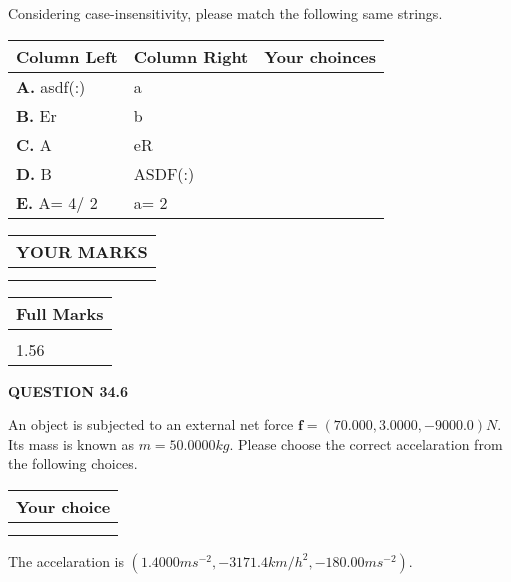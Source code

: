 \documentclass[12pt]{article}
\begin{document}
  
Considering case-insensitivity, please match the following same strings.
  
  
\begin{tabular}{|l|l|l|}
 \hline
 Column Left & Column Right  & Your choinces \\ 
 \hline
{\textbf{\large{
A.}}}
asdf(:)
  & 
a
 & 
 \\ 
 \hline
{\textbf{\large{
B.}}}
Er
  & 
b
 & 
 \\ 
 \hline
{\textbf{\large{
C.}}}
A
  & 
eR
 & 
 \\ 
 \hline
{\textbf{\large{
D.}}}
B
  & 
ASDF(:)
 & 
 \\ 
 \hline
{\textbf{\large{
E.}}}
 A= %
4/ %
2

  & 
 a= %
2
 & 
 \\ 
 \hline
 \end{tabular}
  
  
 
  
\vspace{0.2in}
  
\noindent\begin{tabular}{|l|}
\hline
 YOUR MARKS  \\
\hline
 \\ 
 \\ 
\hline
\end{tabular}
\hspace{0.05in} \begin{tabular}{|l|}
\hline
 Full Marks  \\
\hline
 \\ 
1.56 \\
\hline
\end{tabular}
{\textbf{\Large{QUESTION
34.6 
}}}
  
  
 
An object is subjected to an external net force $\mathbf{f}=(
70.000 ,
3.0000,
-9000.0  )N$. Its mass is known as
$m= %
50.0000  kg$. Please choose the correct accelaration
from the following choices.
 
  
  
\noindent\hspace{3.0in} \begin{tabular}{|l|}
\hline
Your choice \\
\hline
 \\ 
 \\ 
\hline
\end{tabular}
  
  
 
 
The accelaration is
$(
1.4000ms^{-2},
-3171.4km/h^2,
-180.00ms^{-2}
).
$
 
\end{document}
